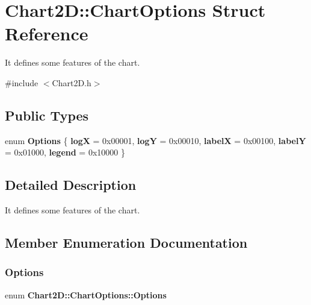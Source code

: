 \section{Chart2D\+:\+:Chart\+Options Struct Reference}
\label{struct_chart2_d_1_1_chart_options}


It defines some features of the chart.  




{\ttfamily \#include $<$Chart2\+D.\+h$>$}

\subsection*{Public Types}
\begin{DoxyCompactItemize}
\item 
enum \textbf{ Options} \{ \newline
\textbf{ logX} = 0x00001, 
\textbf{ logY} = 0x00010, 
\textbf{ labelX} = 0x00100, 
\textbf{ labelY} = 0x01000, 
\newline
\textbf{ legend} = 0x10000
 \}
\end{DoxyCompactItemize}


\subsection{Detailed Description}
It defines some features of the chart. 

\subsection{Member Enumeration Documentation}
\mbox{\label{struct_chart2_d_1_1_chart_options_a796006d22e811fc736d9cf4fb38f6b69}} 
\subsubsection{Options}
{\footnotesize\ttfamily enum \textbf{ Chart2\+D\+::\+Chart\+Options\+::\+Options}}

